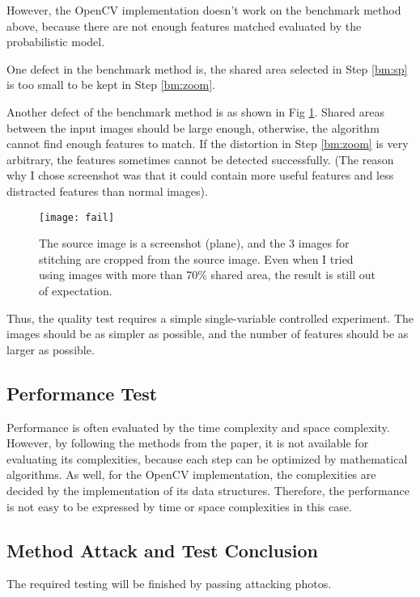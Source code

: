 \documentclass[10pt,twocolumn,letterpaper]{article}
\begin{document}
However, the OpenCV implementation doesn't work on the benchmark method above, because there are not enough features matched evaluated by the probabilistic model.

One defect in the benchmark method is, the shared area selected in Step \ref{bm:sp} is too small to be kept in Step \ref{bm:zoom}.

Another defect of the benchmark method is as shown in Fig \ref{fig:fail}.
Shared areas between the input images should be large enough, otherwise, the algorithm cannot find enough features to match.
If the distortion in Step \ref{bm:zoom} is very arbitrary, the features sometimes cannot be detected successfully.
(The reason why I chose screenshot was that it could contain more useful features and less distracted features than normal images).

\begin{figure}[t]
    \begin{center}
        \texttt{[image: fail]}
    \end{center}
    \caption{The source image is a screenshot (plane), and the 3 images for stitching are cropped from the source image.
    Even when I tried using images with more than 70\% shared area, the result is still out of expectation.}
    \label{fig:fail}
\end{figure}

Thus, the quality test requires a simple single-variable controlled experiment.
The images should be as simpler as possible, and the number of features should be as larger as possible.

\subsection{Performance Test}
Performance is often evaluated by the time complexity and space complexity.
However, by following the methods from the paper, it is not available for evaluating its complexities,
because each step can be optimized by mathematical algorithms. 
As well, for the OpenCV implementation, the complexities are decided by the implementation of its data structures.
Therefore, the performance is not easy to be expressed by time or space complexities in this case.

\subsection{Method Attack and Test Conclusion}
The required testing will be finished by passing attacking photos.
\end{document}
